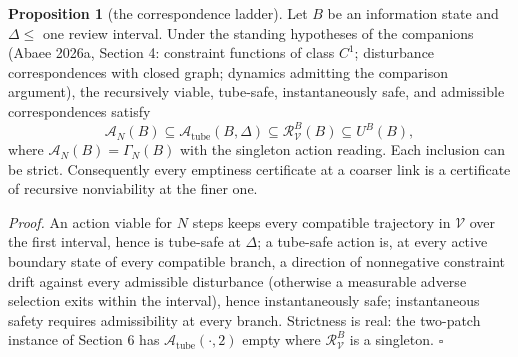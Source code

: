 \documentclass[10pt,twocolumn]{article}
\theoremstyle{definition}
\newtheorem{proposition}{Proposition}
\begin{document}
\begin{proposition}[the correspondence ladder]\label{prop:ladder}
Let \(B\) be an information state and \(\Delta \le\) one review interval.
Under the standing hypotheses of the companions (Abaee 2026a, Section 4:
constraint functions of class \(C^1\); disturbance correspondences with
closed graph; dynamics admitting the comparison argument), the recursively
viable, tube-safe,
instantaneously safe, and admissible correspondences satisfy
\[
\mathcal{A}_{N}(B) \subseteq \mathcal{A}_{\mathrm{tube}}(B, \Delta)
\subseteq \mathcal{R}^{B}_{\mathcal{V}}(B) \subseteq U^{B}(B),
\]
where \(\mathcal{A}_{N}(B) = \Gamma_{N}(B)\) with the singleton action
reading. Each inclusion can be strict. Consequently every emptiness
certificate at a coarser link is a certificate of recursive nonviability at
the finer one.
\end{proposition}

\emph{Proof.} An action viable for \(N\) steps keeps every compatible
trajectory in \(\mathcal{V}\) over the first interval, hence is tube-safe at
\(\Delta\); a tube-safe action is, at every active boundary state of every
compatible branch, a direction of nonnegative constraint drift against
every admissible disturbance (otherwise a measurable adverse selection
exits within the interval), hence instantaneously safe; instantaneous safety
requires admissibility at every branch. Strictness is real: the two-patch
instance of Section 6 has
\(\mathcal{A}_{\mathrm{tube}}(\cdot, 2)\) empty where
\(\mathcal{R}^{B}_{\mathcal{V}}\) is a singleton. \hfill\(\square\)
\end{document}
